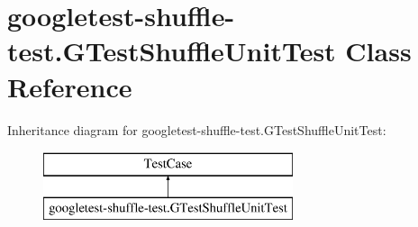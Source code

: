 \hypertarget{classgoogletest-shuffle-test_1_1_g_test_shuffle_unit_test}{}\section{googletest-\/shuffle-\/test.G\+Test\+Shuffle\+Unit\+Test Class Reference}
\label{classgoogletest-shuffle-test_1_1_g_test_shuffle_unit_test}
Inheritance diagram for googletest-\/shuffle-\/test.G\+Test\+Shuffle\+Unit\+Test\+:\begin{figure}[H]
\begin{center}
\leavevmode
\includegraphics[height=2.000000cm]{d4/d1f/classgoogletest-shuffle-test_1_1_g_test_shuffle_unit_test}
\end{center}
\end{figure}
